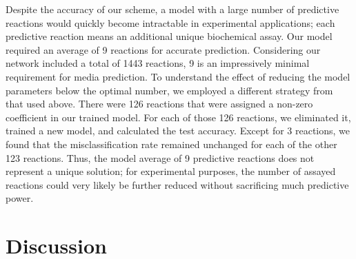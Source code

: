 \documentclass[12pt]{article}
\begin{document}
Despite the accuracy of our scheme, a model with a large number of predictive reactions would quickly become intractable in experimental applications; each predictive reaction means an additional unique biochemical assay. Our model required an average of 9 reactions for accurate prediction. Considering our network included a total of 1443 reactions, 9 is an impressively minimal requirement for media prediction. To understand the effect of reducing the model parameters below the optimal number, we employed a different strategy from that used above. There were 126 reactions that were assigned a non-zero coefficient in our trained model. For each of those 126 reactions, we eliminated it, trained a new model, and calculated the test accuracy. Except for 3 reactions, we found that the misclassification rate remained unchanged for each of the other 123 reactions. Thus, the model average of 9 predictive reactions does not represent a unique solution; for experimental purposes, the number of assayed reactions could very likely be further reduced without sacrificing much predictive power.


\section*{Discussion}
\end{document}

